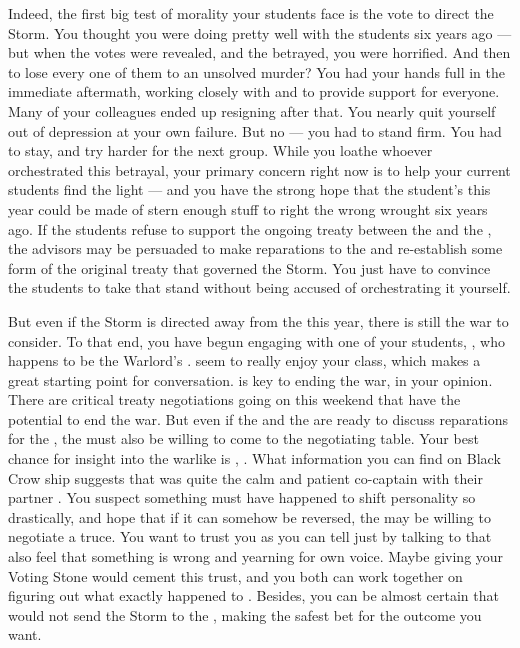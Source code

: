 \documentclass[char]{GL2020}
\begin{document}
Indeed, the first big test of morality your students face is the vote to direct the Storm. You thought you were doing pretty well with the students six years ago — but when the votes were revealed, and the \pShip{} betrayed, you were horrified. And then to lose every one of them to an unsolved murder? You had your hands full in the immediate aftermath, working closely with \cFlowPriest{\full} and \cMusic{\full} to provide support for everyone. Many of your colleagues ended up resigning after that. You nearly quit yourself out of depression at your own failure. But no — you had to stand firm. You had to stay, and try harder for the next group. While you loathe whoever orchestrated this betrayal, your primary concern right now is to help your current students find the light — and you have the strong hope that the student's this year could be made of stern enough stuff to right the wrong wrought six years ago. If the students refuse to support the ongoing treaty between the \pFarm{} and the \pTech{}, the advisors may be persuaded to make reparations to the \pShip{} and re-establish some form of the original treaty that governed the Storm. You just have to convince the students to take that stand without being accused of orchestrating it yourself.

But even if the Storm is directed away from the \pShip{} this year, there is still the war to consider. To that end, you have begun engaging with one of your \pShippie{} students, \cWarlordDaughter{\full}, who happens to be the Warlord's \cWarlordDaughter{\offspring}. \cWarlordDaughter{\They} seem\cWarlordDaughter{\verbs} to really enjoy your class, which makes a great starting point for conversation. \cWarlordDaughter{} is key to ending the war, in your opinion. There are critical treaty negotiations going on this weekend that have the potential to end the war. But even if the \pFarm{} and the \pTech{} are ready to discuss reparations for the \pShippies{}, the \pShip{} must also be willing to come to the negotiating table. Your best chance for insight into the warlike \cLoud{\full} is \cLoud{\their} \cWarlordDaughter{\offspring}, \cWarlordDaughter{}. What information you can find on Black Crow ship suggests that \cLoud{} was quite the calm and patient co-captain with their partner \cQuiet{\full}. You suspect something must have happened to shift \cLoud{\their} personality so drastically, and hope that if it can somehow be reversed, the \pShip{} may be willing to negotiate a truce. You want \cWarlordDaughter{} to trust you as you can tell just by talking to \cWarlordDaughter{\them} that \cWarlordDaughter{\they} also feel\cWarlordDaughter{\verbs} that something is wrong and \cWarlordDaughter{\are} yearning for \cWarlordDaughter{\their} own voice. Maybe giving \cWarlordDaughter{} your Voting Stone would cement this trust, and you both can work together on figuring out what exactly happened to \cLoud{}. Besides, you can be almost certain that \cWarlordDaughter{} would not send the Storm to the \pShip{}, making \cWarlordDaughter{} the safest bet for the outcome you want.  
\end{document}
